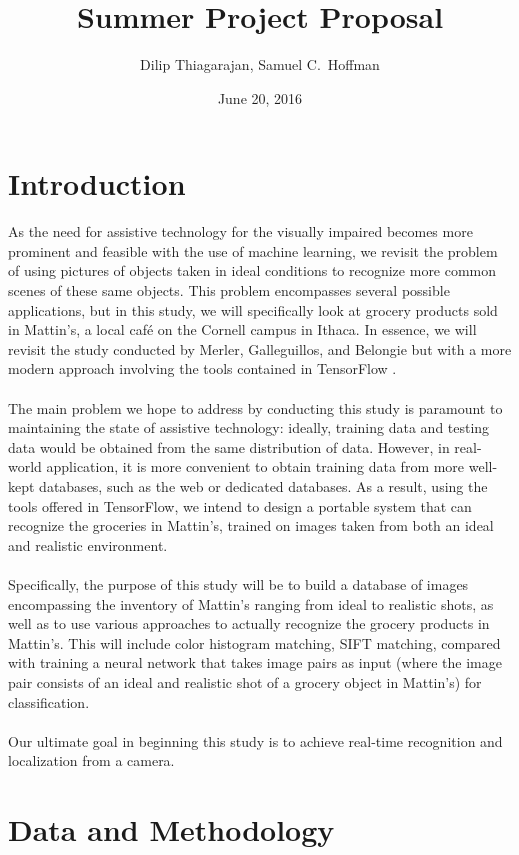 \documentclass{article}
\title{Summer Project Proposal}
\author{Dilip Thiagarajan, Samuel C.\ Hoffman}
\date{June 20, 2016}
\begin{document}
\maketitle

\section{Introduction}

As the need for assistive technology for the visually impaired becomes more prominent and feasible with the use of machine learning, we revisit the problem of using pictures of objects taken in ideal conditions to recognize more common scenes of these same objects. This problem encompasses several possible applications, but in this study, we will specifically look at grocery products sold in Mattin's, a local café on the Cornell campus in Ithaca. In essence, we will revisit the study conducted by Merler, Galleguillos, and Belongie \cite{merler07} but with a more modern approach involving the tools contained in TensorFlow \cite{tensorflow15}.
\\ \\
The main problem we hope to address by conducting this study is paramount to maintaining the state of assistive technology: ideally, training data and testing data would be obtained from the same distribution of data. However, in real-world application, it is more convenient to obtain training data from more well-kept databases, such as the web or dedicated databases. As a result, using the tools offered in TensorFlow, we intend to design a portable system that can recognize the groceries in Mattin's, trained on images taken from both an ideal and realistic environment.
\\ \\
Specifically, the purpose of this study will be to build a database of images encompassing the inventory of Mattin's ranging from ideal to realistic shots, as well as to use various approaches to actually recognize the grocery products in Mattin's. This will include color histogram matching, SIFT matching, compared with training a neural network that takes image pairs as input (where the image pair consists of an ideal and realistic shot of a grocery object in Mattin's) for classification.
\\ \\
Our ultimate goal in beginning this study is to achieve real-time recognition and localization from a camera. 

\section{Data and Methodology}
\end{document}
